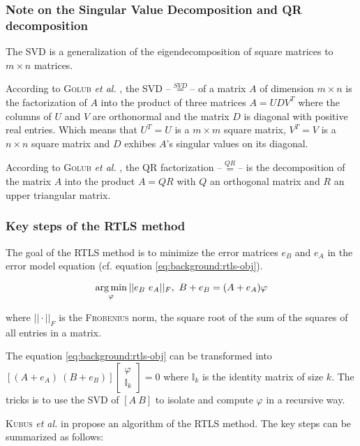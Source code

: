 \documentclass[/home/francois/latex/report/main.tex]{subfiles}
\begin{document}
\subsubsection{Note on the Singular Value Decomposition and QR decomposition}

The \ac{SVD} is a generalization of the eigendecomposition of square matrices to $m \times n$ matrices.

According to \textsc{Golub} \textit{et al.} \cite{Golub1965}, the \ac{SVD} –$\overset{SVD}{=}$– of a matrix $A$ of dimension $m \times n$ is the factorization of $A$ into the product of three matrices $A = UDV^T$ where the columns of $U$ and $V$ are orthonormal and the matrix $D$ is diagonal with positive real entries. Which means that $U^T = U$ is a $m \times m$ square matrix, $V^T = V$ is a $n \times n$ square matrix and $D$ exhibes $A$'s singular values on its diagonal.

According to \textsc{Golub} \textit{et al.} \cite{Golub1996}, the QR factorization –$\overset{QR}{=}$– is the decomposition of the matrix $A$ into the product $A = QR$ with $Q$ an orthogonal matrix and $R$ an upper triangular matrix.

\subsubsection{Key steps of the \ac{RTLS} method}

The goal of the \ac{RTLS} method is to minimize the error matrices $e_B$ and $e_A$ in the error model equation (cf. equation \ref{eq:background:rtls-obj}).

\begin{equation}
  \label{eq:background:rtls-obj}
  \operatorname*{arg\,min}_{\varphi} ||e_B \ e_A||_F, \ B + e_B = (A + e_A) \varphi
\end{equation}

where $|| \cdot ||_F$ is the \textsc{Frobenius} norm, the square root of the sum of the squares of all entries in a matrix.

The equation \ref{eq:background:rtls-obj} can be transformed into $[(A + e_A) \ (B + e_B)]\begin{bmatrix}\varphi \\ \mathbb{I}_k\end{bmatrix} = 0$ where $\mathbb{I}_k$ is the identity matrix of size $k$. The tricks is to use the \ac{SVD} of $[A \ B]$ to isolate and compute $\varphi$ in a recursive way.

\textsc{Kubus} \textit{et al.} in \cite{Kubus2008} propose an algorithm of the \ac{RTLS} method. The key steps can be summarized as follows:
\end{document}
